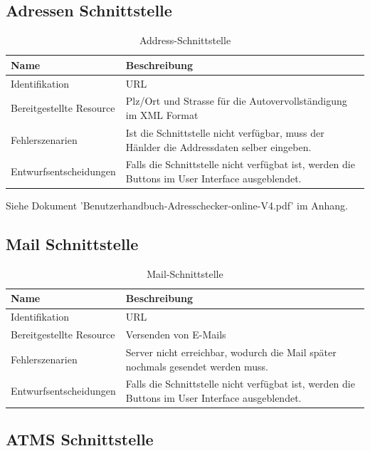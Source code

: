 \subsection{Adressen Schnittstelle}

\begin{table}[H]
	\centering
	\caption{Address-Schnittstelle}
	\begin{tabular}{  | p{4cm} | p{11cm} |}
		\toprule
		{\textbf{Name}} & {\textbf{Beschreibung}} \\
		\midrule
		Identifikation & URL\\ \hline
		Bereitgestellte Resource & Plz/Ort und Strasse für die Autovervollständigung im XML Format \\ \hline
		Fehlerszenarien & Ist die Schnittstelle nicht verfügbar, muss der Hänlder die Addressdaten selber eingeben.\\ \hline
		Entwurfsentscheidungen & Falls die Schnittstelle nicht verfügbat ist, werden die Buttons im User Interface ausgeblendet.\\
		\bottomrule
	\end{tabular}
\end{table}

Siehe Dokument 'Benutzerhandbuch-Adresschecker-online-V4.pdf' im Anhang.

\subsection{Mail Schnittstelle}

\begin{table}[H]
	\centering
	\caption{Mail-Schnittstelle}
	\begin{tabular}{ | p{4cm} | p{11cm} |}
		\toprule
		{\textbf{Name}} & {\textbf{Beschreibung}} \\
		\midrule
		Identifikation & URL\\ \hline
		Bereitgestellte Resource & Versenden von E-Mails\\ \hline
		Fehlerszenarien & Server nicht erreichbar, wodurch die Mail später nochmals gesendet werden muss.\\ \hline
		Entwurfsentscheidungen & Falls die Schnittstelle nicht verfügbat ist, werden die Buttons im User Interface ausgeblendet.\\
		\bottomrule
	\end{tabular}
\end{table}

\subsection{ATMS Schnittstelle}

